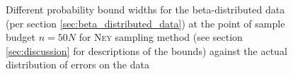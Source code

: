 \begin{figure}[]
	\caption[probability bound widths for beta-distributed sample mean estimates]{Different probability bound widths for the beta-distributed data (per section \ref{sec:beta_distributed_data}) at the point of sample budget $n=50N$ for \textsc{Ney} sampling method (see section \ref{sec:discussion} for descriptions of the bounds) against the actual distribution of errors on the data}
	\label{fig:bounds_widths}
\end{figure}
